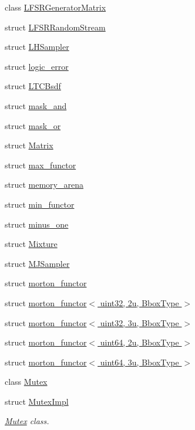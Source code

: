 \begin{DoxyCompactItemize}
class \hyperlink{classcugar_1_1_l_f_s_r_generator_matrix}{L\+F\+S\+R\+Generator\+Matrix}
\item 
struct \hyperlink{structcugar_1_1_l_f_s_r_random_stream}{L\+F\+S\+R\+Random\+Stream}
\item 
struct \hyperlink{structcugar_1_1_l_h_sampler}{L\+H\+Sampler}
\item 
struct \hyperlink{structcugar_1_1logic__error}{logic\+\_\+error}
\item 
struct \hyperlink{structcugar_1_1_l_t_c_bsdf}{L\+T\+C\+Bsdf}
\item 
struct \hyperlink{structcugar_1_1mask__and}{mask\+\_\+and}
\item 
struct \hyperlink{structcugar_1_1mask__or}{mask\+\_\+or}
\item 
struct \hyperlink{structcugar_1_1_matrix}{Matrix}
\item 
struct \hyperlink{structcugar_1_1max__functor}{max\+\_\+functor}
\item 
struct \hyperlink{structcugar_1_1memory__arena}{memory\+\_\+arena}
\item 
struct \hyperlink{structcugar_1_1min__functor}{min\+\_\+functor}
\item 
struct \hyperlink{structcugar_1_1minus__one}{minus\+\_\+one}
\item 
struct \hyperlink{structcugar_1_1_mixture}{Mixture}
\item 
struct \hyperlink{structcugar_1_1_m_j_sampler}{M\+J\+Sampler}
\item 
struct \hyperlink{structcugar_1_1morton__functor}{morton\+\_\+functor}
\item 
struct \hyperlink{structcugar_1_1morton__functor_3_01uint32_00_012u_00_01_bbox_type_01_4}{morton\+\_\+functor$<$ uint32, 2u, Bbox\+Type $>$}
\item 
struct \hyperlink{structcugar_1_1morton__functor_3_01uint32_00_013u_00_01_bbox_type_01_4}{morton\+\_\+functor$<$ uint32, 3u, Bbox\+Type $>$}
\item 
struct \hyperlink{structcugar_1_1morton__functor_3_01uint64_00_012u_00_01_bbox_type_01_4}{morton\+\_\+functor$<$ uint64, 2u, Bbox\+Type $>$}
\item 
struct \hyperlink{structcugar_1_1morton__functor_3_01uint64_00_013u_00_01_bbox_type_01_4}{morton\+\_\+functor$<$ uint64, 3u, Bbox\+Type $>$}
\item 
class \hyperlink{classcugar_1_1_mutex}{Mutex}
\item 
struct \hyperlink{structcugar_1_1_mutex_impl}{Mutex\+Impl}
\begin{DoxyCompactList}\small\item\em \hyperlink{classcugar_1_1_mutex}{Mutex} class. \end{DoxyCompactList}\item 

\end{DoxyCompactItemize}
